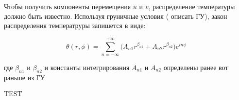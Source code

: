 Чтобы получить компоненты перемещения \(u\) и \(v\), распределение температуры должно быть известно. Используя груничные условия ({\color{red} описать ГУ}), закон распределения температруры запишется в виде:

\begin{equation}
	\label{eq:ch2:equation6}
	\theta(r, \phi) = \sum_{n=-\infty}^{+\infty} \big (A_{n1} r^{\beta_{n1}} + A_{n2} r^{\beta_{n2}} \big ) e^{in \phi}
\end{equation}

где \(\beta_{n1}\) и \(\beta_{n2}\) и константы интегрирования \(A_{n1}\) и \(A_{n2}\) определены ранее {\color{red} вот раньше из ГУ} 

TEST